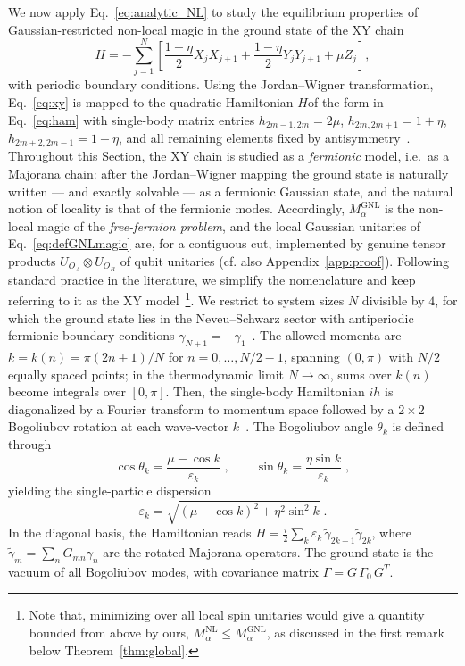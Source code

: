 \documentclass[prx,twocolumn,superscriptaddress,aps,10pt, frontmatterverbose, reprint,footinbib,longbibliography=true]{revtex4-2}
\newcommand{\RENYI}{\alpha}
\begin{document}
We now apply Eq.~\eqref{eq:analytic_NL} to study the equilibrium properties of Gaussian-restricted non-local magic in the ground state of the XY chain
\begin{equation}
    H = -\sum_{j=1}^{N}\!\left[\frac{1+\eta}{2}X_j X_{j+1} + \frac{1-\eta}{2}Y_j Y_{j+1} + \mu Z_j\right],
    \label{eq:xy}
\end{equation}
with periodic boundary conditions.
Using the Jordan--Wigner transformation, Eq.~\eqref{eq:xy} is mapped to the quadratic Hamiltonian $H$of the form in Eq.~\eqref{eq:ham} with single-body matrix entries $h_{2m-1,2m} = 2\mu$, $h_{2m,2m+1} = 1+\eta$, $h_{2m+2,2m-1} = 1-\eta$, and all remaining elements fixed by antisymmetry~\cite{Mbeng2024}. 
Throughout this Section, the XY chain is studied as a \emph{fermionic} model, i.e.\ as a Majorana chain: after the Jordan--Wigner mapping the ground state is naturally written --- and exactly solvable --- as a fermionic Gaussian state, and the natural notion of locality is that of the fermionic modes. 
Accordingly, $M_\RENYI^{\mathrm{GNL}}$ is the non-local magic of the \textit{free-fermion problem}, and the local Gaussian unitaries of Eq.~\eqref{eq:defGNLmagic} are, for a contiguous cut, implemented by genuine tensor products $U_{O_A}\otimes U_{O_B}$ of qubit unitaries (cf. also Appendix~\ref{app:proof}).
Following standard practice in the literature, we simplify the nomenclature and keep referring to it as the XY model~\footnote{Note that, minimizing over all local spin unitaries would give a quantity bounded from above by ours, $M_\RENYI^{\mathrm{NL}}\le M_\RENYI^{\mathrm{GNL}}$, as discussed in the first remark below Theorem~\ref{thm:global}.}. 
We restrict to system sizes $N$ divisible by $4$, for which the ground state lies in the Neveu--Schwarz sector with antiperiodic fermionic boundary
conditions $\gamma_{N+1}=-\gamma_1$~\cite{Mbeng2024}.
The allowed momenta are 
$k=k(n)= \pi(2n+1)/N$ for $n = 0,\dots, N/2-1$, 
spanning $(0,\pi)$ with $N/2$ equally spaced points; 
in the thermodynamic limit $N\to\infty$, sums over $k(n)$ 
become integrals over $[0,\pi]$.
Then, the single-body Hamiltonian $ih$ is diagonalized by a Fourier transform to momentum space followed by a $2\times 2$ Bogoliubov rotation at each wave-vector $k$~\cite{Mbeng2024}.
The Bogoliubov angle $\theta_k$ is defined through
\begin{equation}
    \cos\theta_k = \frac{\mu - \cos k}{\varepsilon_k}\;,\qquad \sin\theta_k = \frac{\eta\sin k}{\varepsilon_k}\;,
    \label{eq:bogoliubov_angle}
\end{equation}
yielding the single-particle dispersion
\begin{equation}
    \varepsilon_k = \sqrt{(\mu-\cos k)^2 + \eta^2\sin^2 k}\;.
    \label{eq:dispersion}
\end{equation}
In the diagonal basis, the Hamiltonian reads $H = \frac{i}{2}\sum_k \varepsilon_k\,\tilde\gamma_{2k-1}\tilde\gamma_{2k}$, where $\tilde\gamma_m = \sum_n G_{mn}\gamma_n$ are the rotated Majorana operators.
The ground state is the vacuum of all Bogoliubov modes, with covariance matrix $\Gamma = G\,\Gamma_0\, G^T$.
\end{document}

